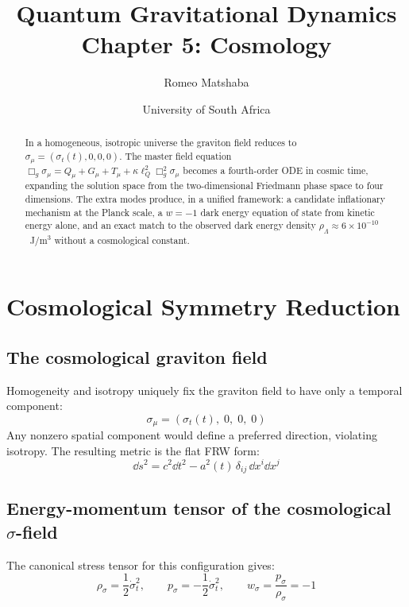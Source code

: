 \documentclass[11pt,a4paper]{article}
\title{\textbf{Quantum Gravitational Dynamics}\\[4pt]
\Large Chapter 5: Cosmology}
\author{Romeo Matshaba}
\date{University of South Africa}
\theoremstyle{plain}
\theoremstyle{definition}
\theoremstyle{remark}
\newcommand{\lQ}{\ell_Q}
\begin{document}
\maketitle

\begin{abstract}
In a homogeneous, isotropic universe the graviton field reduces to $\sigma_\mu = (\sigma_t(t),0,0,0)$.  The master field equation $\Box_g\sigma_\mu = Q_\mu + G_\mu + T_\mu + \kappa\lQ^2\Box_g^2\sigma_\mu$ becomes a fourth-order ODE in cosmic time, expanding the solution space from the two-dimensional Friedmann phase space to four dimensions.  The extra modes produce, in a unified framework: a candidate inflationary mechanism at the Planck scale, a $w = -1$ dark energy equation of state from kinetic energy alone, and an exact match to the observed dark energy density $\rho_\Lambda \approx 6\times10^{-10}$~J/m$^3$ without a cosmological constant.
\end{abstract}

\tableofcontents

\section{Cosmological Symmetry Reduction}
\label{sec:symmetry}

\subsection{The cosmological graviton field}

Homogeneity and isotropy uniquely fix the graviton field to have only a temporal component:
\begin{equation}
  \sigma_\mu = (\sigma_t(t),\;0,\;0,\;0)
\end{equation}
Any nonzero spatial component would define a preferred direction, violating isotropy.  The resulting metric is the flat FRW form:
\begin{equation}
  \dd s^2 = c^2\dd t^2 - a^2(t)\,\delta_{ij}\,\dd x^i\dd x^j
\end{equation}

\subsection{Energy-momentum tensor of the cosmological $\sigma$-field}

The canonical stress tensor for this configuration gives:
\begin{equation}
  \rho_\sigma = \frac{1}{2}\dot\sigma_t^2, \qquad p_\sigma = -\frac{1}{2}\dot\sigma_t^2, \qquad \boxed{w_\sigma = \frac{p_\sigma}{\rho_\sigma} = -1}
  \label{eq:w}
\end{equation}
\end{document}
